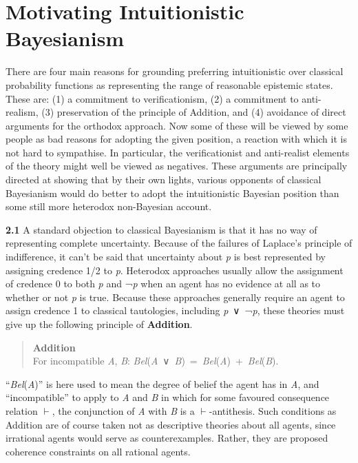 \documentclass[
  10pt,
  letterpaper,
  DIV=11,
  numbers=noendperiod,
  twoside]{scrartcl}
\begin{document}
\section{Motivating Intuitionistic
Bayesianism}\label{motivating-intuitionistic-bayesianism}

There are four main reasons for grounding preferring intuitionistic over
classical probability functions as representing the range of reasonable
epistemic states. These are: (1) a commitment to verificationism, (2) a
commitment to anti-realism, (3) preservation of the principle of
Addition, and (4) avoidance of direct arguments for the orthodox
approach. Now some of these will be viewed by some people as bad reasons
for adopting the given position, a reaction with which it is not hard to
sympathise. In particular, the verificationist and anti-realist elements
of the theory might well be viewed as negatives. These arguments are
principally directed at showing that by their own lights, various
opponents of classical Bayesianism would do better to adopt the
intuitionistic Bayesian position than some still more heterodox
non-Bayesian account.

\textbf{2.1} A standard objection to classical Bayesianism is that it
has no way of representing complete uncertainty. Because of the failures
of Laplace's principle of indifference, it can't be said that
uncertainty about \emph{p} is best represented by assigning credence 1/2
to \emph{p}. Heterodox approaches usually allow the assignment of
credence 0 to both \emph{p} and ¬\emph{p} when an agent has no evidence
at all as to whether or not \emph{p} is true. Because these approaches
generally require an agent to assign credence 1 to classical
tautologies, including \emph{p}~∨~¬\emph{p}, these theories must give up
the following principle of \textbf{Addition}.

\begin{quote}
\textbf{Addition}\\
For incompatible \emph{A}, \emph{B}:
\emph{Bel}(\emph{A}~∨~\emph{B})~=~\emph{Bel}(\emph{A})~+~\emph{Bel}(\emph{B}).
\end{quote}

``\emph{Bel}(\emph{A})'' is here used to mean the degree of belief the
agent has in \emph{A}, and ``incompatible'' to apply to \emph{A} and
\emph{B} in which for some favoured consequence relation \(\vdash\), the
conjunction of \emph{A} with \emph{B} is a \(\vdash\)-antithesis. Such
conditions as Addition are of course taken not as descriptive theories
about all agents, since irrational agents would serve as
counterexamples. Rather, they are proposed coherence constraints on all
rational agents.
\end{document}
